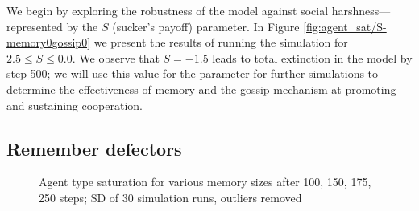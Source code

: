 \documentclass[english]{article}
\begin{document}
We begin by exploring the robustness of the model against social harshness---represented by the $S$ (sucker's payoff) parameter.
In Figure \ref{fig:agent_sat/S-memory0gossip0} we present the results of running the simulation for $2.5 \leq S \leq 0.0$.
We observe that $S = -1.5$ leads to total extinction in the model by step 500;
we will use this value for the parameter for further simulations to determine the effectiveness of memory and the gossip mechanism at promoting and sustaining cooperation.


\subsection{Remember defectors}
\begin{figure}[!ht]
  \centering
  \caption{Agent type saturation for various memory sizes after 100, 150, 175, 250 steps; SD of 30 simulation runs, outliers removed}
  \label{fig:agent_sat/memory_size}
\end{figure}
\end{document}
